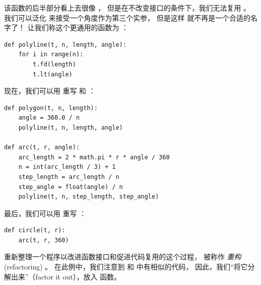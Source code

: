 该函数的后半部分看上去很像  ，
但是在不改变接口的条件下，我们无法复用  。
我们可以泛化  来接受一个角度作为第三个实参， 但是这样  就不再是一个合适的名字了！ 让我们称这个更通用的函数为  ：

\begin{lstlisting}
def polyline(t, n, length, angle):
    for i in range(n):
        t.fd(length)
        t.lt(angle)
\end{lstlisting}


现在，我们可以用  重写  和  ：

\begin{lstlisting}
def polygon(t, n, length):
    angle = 360.0 / n
    polyline(t, n, length, angle)

def arc(t, r, angle):
    arc_length = 2 * math.pi * r * angle / 360
    n = int(arc_length / 3) + 1
    step_length = arc_length / n
    step_angle = float(angle) / n
    polyline(t, n, step_length, step_angle)
\end{lstlisting}


最后，我们可以用  重写  ：

\begin{lstlisting}
def circle(t, r):
    arc(t, r, 360)
\end{lstlisting}


重新整理一个程序以改进函数接口和促进代码复用的这个过程，
被称作 \emph{重构} (refactoring) 。
在此例中，我们注意到  和  中有相似的代码，
因此，我们“将它分解出来”（factor it out），放入  函数。


